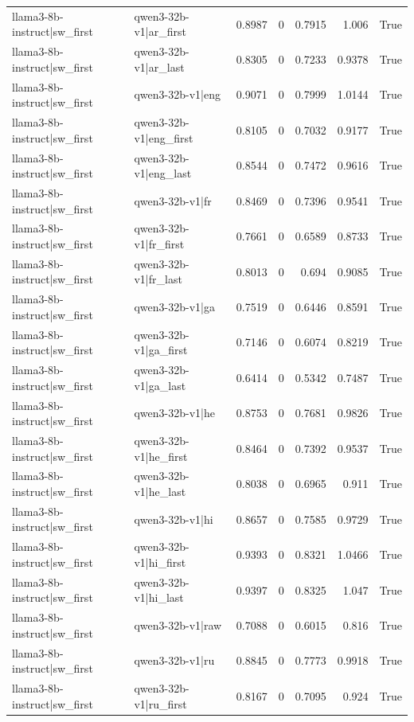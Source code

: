 \begin{table}
\begin{tabular}{l l r r r r l}
llama3-8b-instruct|sw_first & qwen3-32b-v1|ar_first & 0.8987 & 0 & 0.7915 & 1.006 & True \\
llama3-8b-instruct|sw_first & qwen3-32b-v1|ar_last & 0.8305 & 0 & 0.7233 & 0.9378 & True \\
llama3-8b-instruct|sw_first & qwen3-32b-v1|eng & 0.9071 & 0 & 0.7999 & 1.0144 & True \\
llama3-8b-instruct|sw_first & qwen3-32b-v1|eng_first & 0.8105 & 0 & 0.7032 & 0.9177 & True \\
llama3-8b-instruct|sw_first & qwen3-32b-v1|eng_last & 0.8544 & 0 & 0.7472 & 0.9616 & True \\
llama3-8b-instruct|sw_first & qwen3-32b-v1|fr & 0.8469 & 0 & 0.7396 & 0.9541 & True \\
llama3-8b-instruct|sw_first & qwen3-32b-v1|fr_first & 0.7661 & 0 & 0.6589 & 0.8733 & True \\
llama3-8b-instruct|sw_first & qwen3-32b-v1|fr_last & 0.8013 & 0 & 0.694 & 0.9085 & True \\
llama3-8b-instruct|sw_first & qwen3-32b-v1|ga & 0.7519 & 0 & 0.6446 & 0.8591 & True \\
llama3-8b-instruct|sw_first & qwen3-32b-v1|ga_first & 0.7146 & 0 & 0.6074 & 0.8219 & True \\
llama3-8b-instruct|sw_first & qwen3-32b-v1|ga_last & 0.6414 & 0 & 0.5342 & 0.7487 & True \\
llama3-8b-instruct|sw_first & qwen3-32b-v1|he & 0.8753 & 0 & 0.7681 & 0.9826 & True \\
llama3-8b-instruct|sw_first & qwen3-32b-v1|he_first & 0.8464 & 0 & 0.7392 & 0.9537 & True \\
llama3-8b-instruct|sw_first & qwen3-32b-v1|he_last & 0.8038 & 0 & 0.6965 & 0.911 & True \\
llama3-8b-instruct|sw_first & qwen3-32b-v1|hi & 0.8657 & 0 & 0.7585 & 0.9729 & True \\
llama3-8b-instruct|sw_first & qwen3-32b-v1|hi_first & 0.9393 & 0 & 0.8321 & 1.0466 & True \\
llama3-8b-instruct|sw_first & qwen3-32b-v1|hi_last & 0.9397 & 0 & 0.8325 & 1.047 & True \\
llama3-8b-instruct|sw_first & qwen3-32b-v1|raw & 0.7088 & 0 & 0.6015 & 0.816 & True \\
llama3-8b-instruct|sw_first & qwen3-32b-v1|ru & 0.8845 & 0 & 0.7773 & 0.9918 & True \\
llama3-8b-instruct|sw_first & qwen3-32b-v1|ru_first & 0.8167 & 0 & 0.7095 & 0.924 & True \\

\end{tabular}
\end{table}
